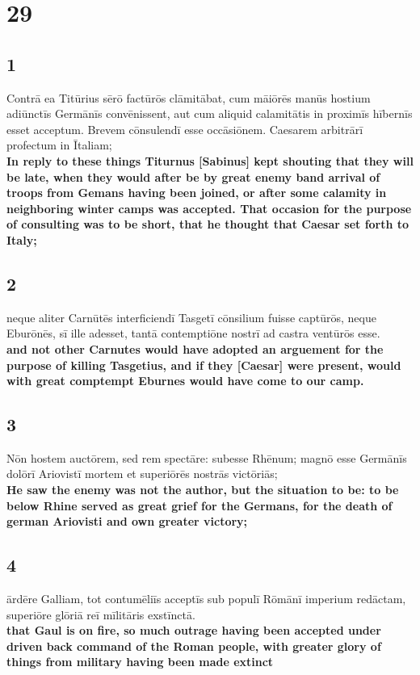 \documentclass{article}
\begin{document}
\section*{29}
\subsection*{1}
Contrā ea Titūrius sērō factūrōs clāmitābat, cum māiōrēs manūs hostium adiūnctīs Germānīs convēnissent, aut cum aliquid calamitātis in proximīs hībernīs esset acceptum. Brevem cōnsulendī esse occāsiōnem. Caesarem arbitrārī profectum in Ītaliam; \\
\textbf{In reply to these things Titurnus [Sabinus] kept shouting that they will be late, when they would after be by great enemy band arrival of troops from Gemans having been joined, or after some calamity in neighboring winter camps was accepted. That occasion for the purpose of consulting was to be short, that he thought that Caesar set forth to Italy;}

\subsection*{2}
neque aliter Carnūtēs interficiendī Tasgetī cōnsilium fuisse captūrōs, neque Eburōnēs, sī ille adesset, tantā contemptiōne nostrī ad castra ventūrōs esse. \\
\textbf{and not other Carnutes would have adopted an arguement for the purpose of killing Tasgetius, and if they [Caesar] were present, would with great comptempt Eburnes would have come to our camp.}


\subsection*{3}
Nōn hostem auctōrem, sed rem spectāre: subesse Rhēnum; magnō esse Germānīs dolōrī Ariovistī mortem et superiōrēs nostrās victōriās; \\
\textbf{He saw the enemy was not the author, but the situation to be: to be below Rhine served as great grief for the Germans, for the death of german Ariovisti and own greater victory;}

\subsection*{4}
ārdēre Galliam, tot contumēliīs acceptīs sub populī Rōmānī imperium redāctam, superiōre glōriā reī mīlitāris exstīnctā. \\
\textbf{that Gaul is on fire, so much outrage having been accepted under driven back command of the Roman people, with greater glory of things from military having been made extinct}
\end{document}
